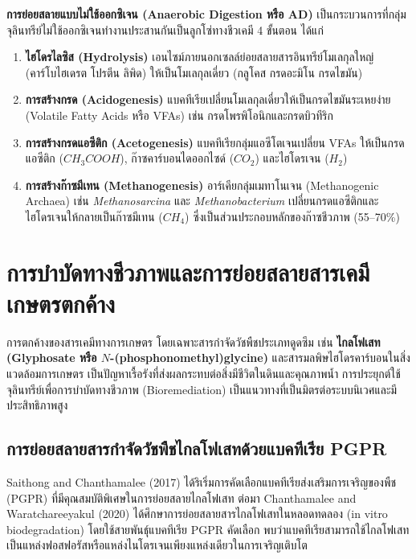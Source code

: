 \textbf{การย่อยสลายแบบไม่ใช้ออกซิเจน (Anaerobic Digestion หรือ AD)} เป็นกระบวนการที่กลุ่มจุลินทรีย์ไม่ใช้ออกซิเจนทำงานประสานกันเป็นลูกโซ่ทางชีวเคมี 4 ขั้นตอน ได้แก่
\begin{enumerate}
    \item \textbf{ไฮโดรไลซิส (Hydrolysis)} เอนไซม์ภายนอกเซลล์ย่อยสลายสารอินทรีย์โมเลกุลใหญ่ (คาร์โบไฮเดรต โปรตีน ลิพิด) ให้เป็นโมเลกุลเดี่ยว (กลูโคส กรดอะมิโน กรดไขมัน)
    \item \textbf{การสร้างกรด (Acidogenesis)} แบคทีเรียเปลี่ยนโมเลกุลเดี่ยวให้เป็นกรดไขมันระเหยง่าย (Volatile Fatty Acids หรือ VFAs) เช่น กรดโพรพิโอนิกและกรดบิวทีริก
    \item \textbf{การสร้างกรดแอซีติก (Acetogenesis)} แบคทีเรียกลุ่มแอซีโตเจนเปลี่ยน VFAs ให้เป็นกรดแอซีติก ($CH_3COOH$), ก๊าซคาร์บอนไดออกไซด์ ($CO_2$) และไฮโดรเจน ($H_2$)
    \item \textbf{การสร้างก๊าซมีเทน (Methanogenesis)} อาร์เคียกลุ่มเมทาโนเจน (Methanogenic Archaea) เช่น \textit{Methanosarcina} และ \textit{Methanobacterium} เปลี่ยนกรดแอซีติกและไฮโดรเจนให้กลายเป็นก๊าซมีเทน ($CH_4$) ซึ่งเป็นส่วนประกอบหลักของก๊าซชีวภาพ (55--70\%)
\end{enumerate}

\section{การบำบัดทางชีวภาพและการย่อยสลายสารเคมีเกษตรตกค้าง}

การตกค้างของสารเคมีทางการเกษตร โดยเฉพาะสารกำจัดวัชพืชประเภทดูดซึม เช่น \textbf{ไกลโฟเสท (Glyphosate หรือ $N$-(phosphonomethyl)glycine)} และสารมลพิษไฮโดรคาร์บอนในสิ่งแวดล้อมการเกษตร เป็นปัญหาเรื้อรังที่ส่งผลกระทบต่อสิ่งมีชีวิตในดินและคุณภาพน้ำ การประยุกต์ใช้จุลินทรีย์เพื่อการบำบัดทางชีวภาพ (Bioremediation) เป็นแนวทางที่เป็นมิตรต่อระบบนิเวศและมีประสิทธิภาพสูง

\subsection{การย่อยสลายสารกำจัดวัชพืชไกลโฟเสทด้วยแบคทีเรีย PGPR}
Saithong and Chanthamalee (2017) ได้ริเริ่มการคัดเลือกแบคทีเรียส่งเสริมการเจริญของพืช (PGPR) ที่มีคุณสมบัติพิเศษในการย่อยสลายไกลโฟเสท ต่อมา Chanthamalee and Waratchareeyakul (2020) ได้ศึกษาการย่อยสลายสารไกลโฟเสทในหลอดทดลอง (in vitro biodegradation) โดยใช้สายพันธุ์แบคทีเรีย PGPR คัดเลือก พบว่าแบคทีเรียสามารถใช้ไกลโฟเสทเป็นแหล่งฟอสฟอรัสหรือแหล่งไนโตรเจนเพียงแหล่งเดียวในการเจริญเติบโต

